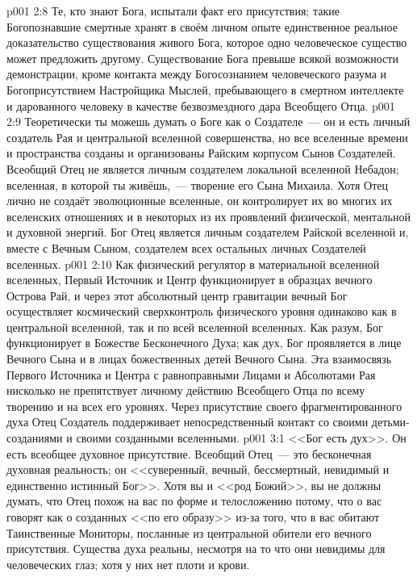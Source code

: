 \vs p001 2:8 Те, кто знают Бога, испытали факт его присутствия; такие Богопознавшие смертные хранят в своём личном опыте единственное реальное доказательство существования живого Бога, которое одно человеческое существо может предложить другому. Существование Бога превыше всякой возможности демонстрации, кроме контакта между Богосознанием человеческого разума и Богоприсутствием Настройщика Мыслей, пребывающего в смертном интеллекте и дарованного человеку в качестве безвозмездного дара Всеобщего Отца.
\vs p001 2:9 \pc Теоретически ты можешь думать о Боге как о Создателе~--- он и есть личный создатель Рая и центральной вселенной совершенства, но все вселенные времени и пространства созданы и организованы Райским корпусом Сынов Создателей. Всеобщий Отец не является личным создателем локальной вселенной Небадон; вселенная, в которой ты живёшь,~--- творение его Сына Михаила. Хотя Отец лично не создаёт эволюционные вселенные, он контролирует их во многих их вселенских отношениях и в некоторых из их проявлений физической, ментальной и духовной энергий. Бог Отец является личным создателем Райской вселенной и, вместе с Вечным Сыном, создателем всех остальных личных Создателей вселенных.
\vs p001 2:10 \pc Как физический регулятор в материальной вселенной вселенных, Первый Источник и Центр функционирует в образцах вечного Острова Рай, и через этот абсолютный центр гравитации вечный Бог осуществляет космический сверхконтроль физического уровня одинаково как в центральной вселенной, так и по всей вселенной вселенных. Как разум, Бог функционирует в Божестве Бесконечного Духа; как дух, Бог проявляется в лице Вечного Сына и в лицах божественных детей Вечного Сына. Эта взаимосвязь Первого Источника и Центра с равноправными Лицами и Абсолютами Рая нисколько не препятствует  личному действию Всеобщего Отца по всему творению и на всех его уровнях. Через присутствие своего фрагментированного духа Отец Создатель поддерживает непосредственный контакт со своими детьми\hyp{}созданиями и своими созданными вселенными.
\vs p001 3:1 <<Бог есть дух>>. Он есть всеобщее духовное присутствие. Всеобщий Отец~--- это бесконечная духовная реальность; он <<суверенный, вечный, бессмертный, невидимый и единственно истинный Бог>>. Хотя вы и <<род Божий>>, вы не должны думать, что Отец похож на вас по форме и телосложению потому, что о вас говорят как о созданных <<по его образу>> из-за того, что в вас обитают Таинственные Мониторы, посланные из центральной обители его вечного присутствия. Существа духа реальны, несмотря на то что они невидимы для человеческих глаз; хотя у них нет плоти и крови.
